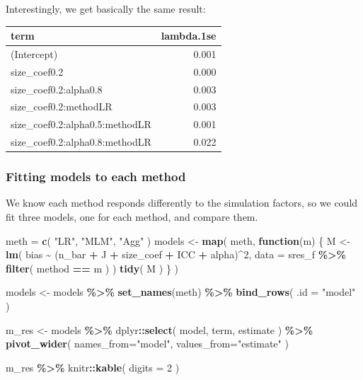 \documentclass[
]{book}
\newenvironment{Shaded}{\begin{snugshade}}{\end{snugshade}}
\newcommand{\AttributeTok}[1]{\textcolor[rgb]{0.13,0.29,0.53}{#1}}
\newcommand{\ControlFlowTok}[1]{\textcolor[rgb]{0.13,0.29,0.53}{\textbf{#1}}}
\newcommand{\DecValTok}[1]{\textcolor[rgb]{0.00,0.00,0.81}{#1}}
\newcommand{\FunctionTok}[1]{\textcolor[rgb]{0.13,0.29,0.53}{\textbf{#1}}}
\newcommand{\NormalTok}[1]{#1}
\newcommand{\OtherTok}[1]{\textcolor[rgb]{0.56,0.35,0.01}{#1}}
\newcommand{\SpecialCharTok}[1]{\textcolor[rgb]{0.81,0.36,0.00}{\textbf{#1}}}
\newcommand{\StringTok}[1]{\textcolor[rgb]{0.31,0.60,0.02}{#1}}
\begin{document}
Interestingly, we get basically the same result:

\begin{tabular}{l|r}
\hline
term & lambda.1se\\
\hline
(Intercept) & 0.001\\
\hline
size\_coef0.2 & 0.000\\
\hline
size\_coef0.2:alpha0.8 & 0.003\\
\hline
size\_coef0.2:methodLR & 0.003\\
\hline
size\_coef0.2:alpha0.5:methodLR & 0.001\\
\hline
size\_coef0.2:alpha0.8:methodLR & 0.022\\
\hline
\end{tabular}

\subsubsection{Fitting models to each method}\label{fitting-models-to-each-method}

We know each method responds differently to the simulation factors, so we could fit three models, one for each method, and compare them.

\begin{Shaded}
\begin{Highlighting}[]
\NormalTok{meth }\OtherTok{=} \FunctionTok{c}\NormalTok{( }\StringTok{"LR"}\NormalTok{, }\StringTok{"MLM"}\NormalTok{, }\StringTok{"Agg"}\NormalTok{ )}
\NormalTok{models }\OtherTok{\textless{}{-}} \FunctionTok{map}\NormalTok{( meth, }\ControlFlowTok{function}\NormalTok{(m) \{}
\NormalTok{  M }\OtherTok{\textless{}{-}} \FunctionTok{lm}\NormalTok{( bias }\SpecialCharTok{\textasciitilde{}}\NormalTok{ (n\_bar }\SpecialCharTok{+}\NormalTok{ J }\SpecialCharTok{+}\NormalTok{ size\_coef }\SpecialCharTok{+}\NormalTok{ ICC }\SpecialCharTok{+}\NormalTok{ alpha)}\SpecialCharTok{\^{}}\DecValTok{2}\NormalTok{, }
      \AttributeTok{data =}\NormalTok{ sres\_f }\SpecialCharTok{\%\textgreater{}\%} \FunctionTok{filter}\NormalTok{( method }\SpecialCharTok{==}\NormalTok{ m ) )}
  \FunctionTok{tidy}\NormalTok{( M )}
\NormalTok{\} )}

\NormalTok{models }\OtherTok{\textless{}{-}} 
\NormalTok{  models }\SpecialCharTok{\%\textgreater{}\%} 
  \FunctionTok{set\_names}\NormalTok{(meth) }\SpecialCharTok{\%\textgreater{}\%} 
  \FunctionTok{bind\_rows}\NormalTok{( }\AttributeTok{.id =} \StringTok{"model"}\NormalTok{ )}

\NormalTok{m\_res }\OtherTok{\textless{}{-}}\NormalTok{ models }\SpecialCharTok{\%\textgreater{}\%} 
\NormalTok{  dplyr}\SpecialCharTok{::}\FunctionTok{select}\NormalTok{( model, term, estimate ) }\SpecialCharTok{\%\textgreater{}\%}
  \FunctionTok{pivot\_wider}\NormalTok{( }\AttributeTok{names\_from=}\StringTok{"model"}\NormalTok{, }\AttributeTok{values\_from=}\StringTok{"estimate"}\NormalTok{ )}

\NormalTok{m\_res }\SpecialCharTok{\%\textgreater{}\%}
\NormalTok{  knitr}\SpecialCharTok{::}\FunctionTok{kable}\NormalTok{( }\AttributeTok{digits =} \DecValTok{2}\NormalTok{ )}
\end{Highlighting}
\end{Shaded}
\end{document}
